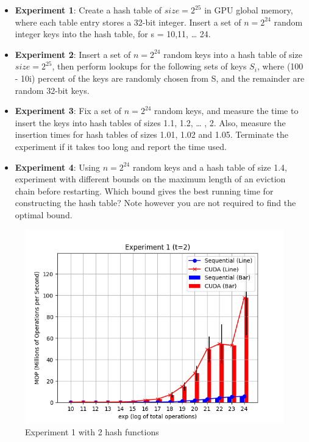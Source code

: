 \documentclass{article}
\begin{document}
\begin{itemize}
    \item \textbf{Experiment 1}: Create a hash table of $size=2^{25}$ in GPU global memory, where each table entry stores a
    32-bit integer. Insert a set of $n=2^{24}$ random integer keys into the hash table, for s =
    10,11, … 24.
    \item \textbf{Experiment 2}: Insert a set of $n=2^{24}$ random keys into a hash table of size $size=2^{25}$, then perform lookups
    for the following sets of keys $S_i$, where
    (100 - 10i) percent of the keys are randomly chosen from S, and the remainder are
    random 32-bit keys.
    \item \textbf{Experiment 3}: Fix a set of $n=2^{24}$ random keys, and measure the time to insert the keys into hash
    tables of sizes 1.1, 1.2, … , 2. Also, measure the insertion times for hash tables of
    sizes 1.01, 1.02 and 1.05. Terminate the experiment if it takes too long and report
    the time used.
    \item \textbf{Experiment 4}: Using $n=2^{24}$ random keys and a hash table of size 1.4, experiment with different
    bounds on the maximum length of an eviction chain before restarting. Which bound
    gives the best running time for constructing the hash table? Note however you are not
    required to find the optimal bound.
\end{itemize}

\begin{figure}[h!]
    \centering
    \includegraphics[width=\textwidth]{../figs/experiment1_t2.png}
    \caption{Experiment 1 with 2 hash functions}
\end{figure}
\end{document}

